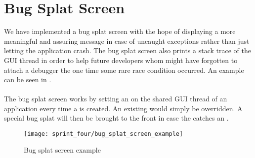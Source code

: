 
\section{Bug Splat Screen}
\label{sec:bug_splat_screen}

We have implemented a bug splat screen with the hope of displaying a more meaningful and assuring message in case of uncaught exceptions rather than just letting the application crash. The bug splat screen also prints a stack trace of the GUI thread in order to help future developers whom might have forgotten to attach a debugger the one time some rare race condition occurred. An example can be seen in .
\\\\
The bug splat screen works by setting an  on the shared GUI thread of an application every time a  is created. An existing  would simply be overridden. A special bug splat  will then be brought to the front in case the  catches an .

\begin{figure}[!htbp]
        \centering
        \texttt{[image: sprint\_four/bug\_splat\_screen\_example]}
        \caption{Bug splat screen example}
        \label{fig:bug_splat_screen_example}
\end{figure}


